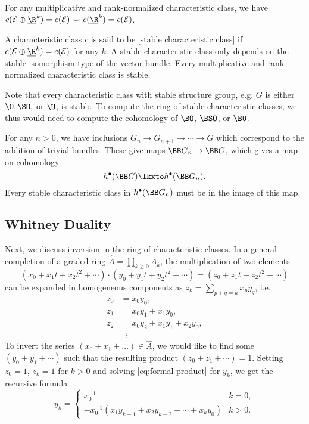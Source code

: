 \begin{corollary}
	For any multiplicative and rank-normalized characteristic class, we have $c(\mathcal{E}\oplus \underline{\R}^k)=c(\mathcal{E})\smile c(\underline{\R}^k)= c(\mathcal{E})$.
\end{corollary}

\begin{definition}
	A characteristic class $c$ is said to be [stable characteristic class] if $c(\mathcal{E}\oplus \underline{\R}^k) = c(\mathcal{E})$ for any $k$. A stable characteristic class only depends on the stable isomorphism type of the vector bundle. Every multiplicative and rank-normalized characteristic class is stable.
\end{definition}

\begin{remark}
	Note that every characteristic class with stable structure group, e.g. $G$ is either $\O, \SO,$ or $\U$, is stable. To compute the ring of stable characteristic classes, we thus would need to compute the cohomology of $\BO$, $\BSO$, or $\BU$.

	For any $n>0$, we have inclusions $G_n \to G_{n+1} \to \cdots \to G$ which correspond to the addition of trivial bundles. These give maps $\BB G_n \to \BB G$, which gives a map on cohomology
	\[
		h^\bullet(\BB G) \lkxto h^\bullet(\BB G_n).
	\]
	Every stable characteristic class in $h^\bullet(\BB G_n)$ must be in the image of this map.
\end{remark}

\subsection{Whitney Duality}

Next, we discuss inversion in the ring of characteristic classes.
In a general completion of a graded ring $\widehat{A}=\prod_{k\geq 0}A_k$, the multiplication of two elements
\[
	(x_0+x_1t +x_2t^2+\cdots)\cdot (y_0+y_1t+y_2t^2+\cdots) = (z_0 + z_1t + z_2t^2+\cdots)
\]
can be expanded in homogeneous components as $z_k=\sum_{p+q=k} x_py_q$, i.e.
\begin{equation}\label{eq:formal-product}
	\begin{aligned}
		z_0 & = x_0y_0,                 \\
		z_1 & = x_0y_1 + x_1y_0,        \\
		z_2 & = x_0y_2 + x_1y_1+x_2y_0, \\
		    & \;\;\vdots
	\end{aligned}
\end{equation}
To invert the series $(x_0+ x_1+\ldots)\in \widehat{A}$, we would like to find some $(y_0+y_1+\cdots)$ such that the resulting product $(z_0+z_1+\cdots)=1$. Setting $z_0=1$, $z_k=1$ for $k>0$ and solving \cref{eq:formal-product} for $y_k$, we get the recursive formula
\begin{equation}\label{eq:formal-inversion}
	y_k = \begin{cases}x_0^{-1}                                        & k=0,   \\
             -x_0^{-1}(x_1y_{k-1}+x_2y_{k-2}+\cdots +x_ky_0) & k > 0.
	\end{cases}
\end{equation}

